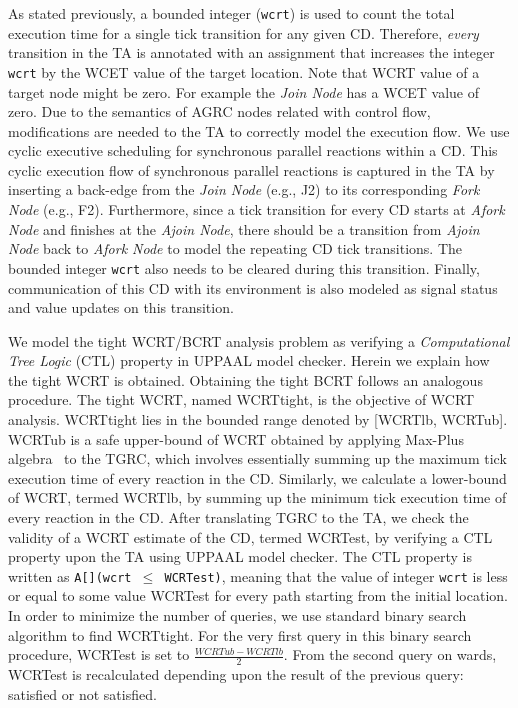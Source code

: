 As stated previously, a bounded integer (\texttt{wcrt}) is used to count
the total execution time for a single tick transition for any given CD.
Therefore, \textit{every} transition in the TA is annotated with an
assignment that increases the integer \texttt{wcrt} by the WCET value of
the target location. Note that WCRT value of a target node might be
zero. For example the \textit{Join Node} has a WCET value of zero. Due
to the semantics of AGRC nodes related with control flow, modifications
are needed to the TA to correctly model the execution flow. We use
cyclic executive scheduling \cite{amal10} for synchronous parallel
reactions within a CD. This cyclic execution flow of synchronous
parallel reactions is captured in the TA by inserting a back-edge from
the \textit{Join Node} (e.g., J2) to its corresponding \textit{Fork
Node} (e.g., F2). Furthermore, since a tick transition for every CD
starts at \textit{Afork Node} and finishes at the \textit{Ajoin Node},
there should be a transition from \textit{Ajoin Node} back to
\textit{Afork Node} to model the repeating CD tick transitions. The
bounded integer \texttt{wcrt} also needs to be cleared during this
transition. Finally, communication of this CD with its environment is
also modeled as signal status and value updates on this transition.

We model the tight WCRT/BCRT analysis problem as verifying a
\textit{Computational Tree Logic} (CTL) property in UPPAAL model
checker. Herein we explain how the tight WCRT is obtained. Obtaining the
tight BCRT follows an analogous procedure. The tight WCRT, named
WCRTtight, is the objective of WCRT analysis. WCRTtight lies in the
bounded range denoted by [WCRTlb, WCRTub]. WCRTub is a safe upper-bound
of WCRT obtained by applying Max-Plus algebra~\cite{boldt07} to the
TGRC, which involves essentially summing up the maximum tick execution
time of every reaction in the CD. Similarly, we calculate a lower-bound
of WCRT, termed WCRTlb, by summing up the minimum tick execution time of
every reaction in the CD. After translating TGRC to the TA, we check the
validity of a WCRT estimate of the CD, termed WCRTest, by verifying a
CTL property upon the TA using UPPAAL model checker. The CTL property is
written as \texttt{A[](wcrt $\leq$ WCRTest)}, meaning that the value of
integer \texttt{wcrt} is less or equal to some value WCRTest for every
path starting from the initial location. In order to minimize the number
of queries, we use standard binary search algorithm to find
WCRTtight. For the very first query in this binary search procedure,
WCRTest is set to $\frac{WCRTub - WCRTlb}{2}$. From the second query on
wards, WCRTest is recalculated depending upon the result of the previous
query: satisfied or not satisfied.

